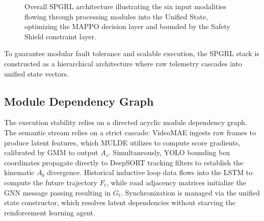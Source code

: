 \documentclass[journal]{IEEEtran}
\begin{document}
\begin{figure}[htbp]
{%
}
\caption{Overall SPGRL architecture illustrating the six input modalities flowing through processing modules into the Unified State, optimizing the MAPPO decision layer and bounded by the Safety Shield constraint layer.}
\label{fig:spgrl_pipeline}
\end{figure}

To guarantee modular fault tolerance and scalable execution, the SPGRL stack is constructed as a hierarchical architecture where raw telemetry cascades into unified state vectors.

\subsection{Module Dependency Graph}
The execution stability relies on a directed acyclic module dependency graph. The semantic stream relies on a strict cascade: VideoMAE ingests raw frames to produce latent features, which MULDE utilizes to compute score gradients, calibrated by GMM to output $A_s$. Simultaneously, YOLO bounding box coordinates propagate directly to DeepSORT tracking filters to establish the kinematic $A_b$ divergence. Historical inductive loop data flows into the LSTM to compute the future trajectory $F_t$, while road adjacency matrices initialize the GNN message passing resulting in $G_t$. Synchronization is managed via the unified state constructor, which resolves latent dependencies without starving the reinforcement learning agent.
\end{document}
